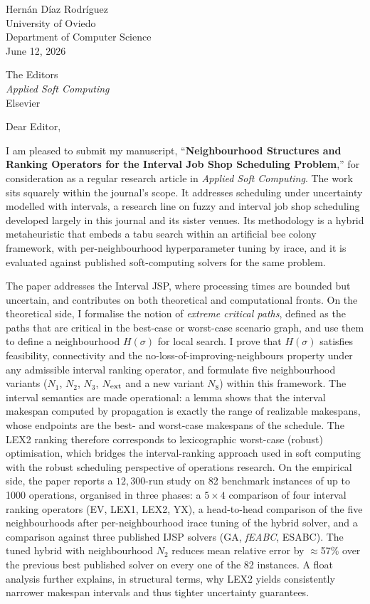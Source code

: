 \documentclass[11pt,a4paper]{article}
\begin{document}
\begin{flushright}
Hern\'an D\'iaz Rodr\'iguez\\
University of Oviedo\\
Department of Computer Science\\[2pt]
June 12, 2026
\end{flushright}

\bigskip

\noindent
The Editors\\
\emph{Applied Soft Computing}\\
Elsevier

\bigskip

\noindent Dear Editor,

I am pleased to submit my manuscript, ``\textbf{Neighbourhood Structures and
Ranking Operators for the Interval Job Shop Scheduling Problem},'' for
consideration as a regular research article in \emph{Applied Soft Computing}.
The work sits squarely within the journal's scope. It addresses scheduling
under uncertainty modelled with intervals, a research line on fuzzy and
interval job shop scheduling developed largely in this journal and its sister
venues. Its methodology is a hybrid metaheuristic that embeds a tabu search
within an artificial bee colony framework, with per-neighbourhood
hyperparameter tuning by irace, and it is evaluated against published
soft-computing solvers for the same problem.

The paper addresses the Interval JSP, where processing times are bounded but
uncertain, and contributes on both theoretical and computational fronts. On
the theoretical side, I formalise the notion of \emph{extreme critical
paths}, defined as the paths that are critical in the best-case or worst-case
scenario graph, and use them to define a neighbourhood $H(\sigma)$ for local
search. I prove that $H(\sigma)$ satisfies feasibility, connectivity and the
no-loss-of-improving-neighbours property under any admissible interval
ranking operator, and formulate five neighbourhood variants ($N_1$, $N_2$,
$N_3$, $N_{\rm ext}$ and a new variant $N_8$) within this framework. The
interval semantics are made operational: a lemma shows that the interval
makespan computed by propagation is exactly the range of realizable
makespans, whose endpoints are the best- and worst-case makespans of the
schedule. The LEX2 ranking therefore corresponds to lexicographic worst-case
(robust) optimisation, which bridges the interval-ranking approach used in
soft computing with the robust scheduling perspective of operations research.
On the empirical side, the paper reports a $12{,}300$-run study on 82
benchmark instances of up to 1000 operations, organised in three phases: a
$5{\times}4$ comparison of four interval ranking operators (EV, LEX1, LEX2,
YX), a head-to-head comparison of the five neighbourhoods after
per-neighbourhood irace tuning of the hybrid solver, and a comparison against
three published IJSP solvers (GA, \emph{fEABC}, ESABC). The tuned hybrid with
neighbourhood $N_2$ reduces mean relative error by $\approx$57\% over the
previous best published solver on every one of the 82 instances. A float
analysis further explains, in structural terms, why LEX2 yields consistently
narrower makespan intervals and thus tighter uncertainty guarantees.
\end{document}

